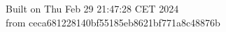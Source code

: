 {\noindent Built on Thu Feb 29 21:47:28 CET 2024} \\ 
 {\noindent from ceca681228140bf55185eb8621bf771a8c48876b}
